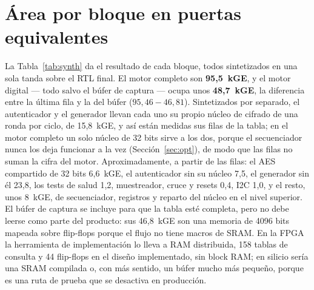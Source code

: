 \section{Área por bloque en puertas equivalentes}
\label{sec:area}

La Tabla~\ref{tab:synth} da el resultado de cada bloque, todos
sintetizados en una sola tanda sobre el \ac{RTL} final. El motor completo
son \textbf{95,5~kGE}, y el motor digital
--- todo salvo el búfer de captura --- ocupa unos \textbf{48,7~kGE}, la
diferencia entre la última fila y la del búfer ($95{,}46 - 46{,}81$).
Sintetizados por separado, el autenticador y el generador llevan cada uno
su propio núcleo de cifrado de una ronda por ciclo, de 15,8~kGE, y así
están medidas sus filas de la tabla; en el motor completo un solo núcleo
de 32 bits sirve a los dos, porque el secuenciador nunca los deja
funcionar a la vez (Sección~\ref{sec:opt}), de modo que las filas no
suman la cifra del motor. Aproximadamente, a partir de las filas: el AES
compartido de 32 bits
6,6~kGE, el autenticador sin su núcleo 7,5, el generador sin él 23,8, los
tests de salud 1,2, muestreador, cruce y resets 0,4, \ac{I2C} 1,0, y
el resto, unos 8~kGE, de secuenciador, registros y reparto del núcleo en
el nivel superior. El
búfer de captura se incluye para que la tabla esté completa, pero no debe
leerse como parte del producto: sus 46,8~kGE son una memoria de 4096 bits
mapeada sobre flip-flops porque el flujo no tiene macros de SRAM. En la
\ac{FPGA} la herramienta de implementación lo lleva a RAM distribuida,
158 tablas de consulta y 44 flip-flops en el diseño implementado, sin
block RAM; en silicio sería una SRAM compilada
o, con más sentido, un búfer mucho más pequeño, porque es una ruta de prueba
que se desactiva en producción.

